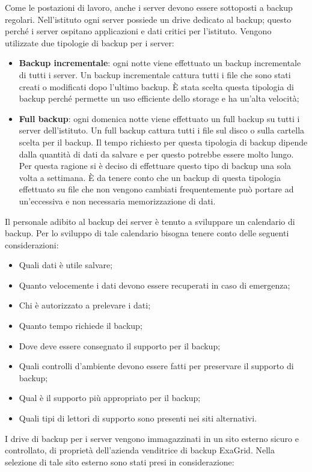 \documentclass[12pt, a4paper, titlepage]{report}
\newcommand{\backupVendor}{ExaGrid} %
\begin{document}
	Come le postazioni di lavoro, anche i server devono essere sottoposti a backup regolari. Nell'istituto ogni server possiede un drive dedicato al backup; questo perché i server ospitano applicazioni e dati critici per l'istituto. Vengono utilizzate due tipologie di backup per i server:
	\begin{itemize}
		\item \textbf{Backup incrementale}: ogni notte viene effettuato un backup incrementale di tutti i server. Un backup incrementale cattura tutti i file che sono stati creati o modificati dopo l'ultimo backup. È stata scelta questa tipologia di backup perché permette un uso efficiente dello storage e ha un'alta velocità;
		\item \textbf{Full backup}: ogni domenica notte viene effettuato un full backup su tutti i server dell'istituto. Un full backup cattura tutti i file sul disco o sulla cartella scelta per il backup. Il tempo richiesto per questa tipologia di backup dipende dalla quantità di dati da salvare e per questo potrebbe essere molto lungo. Per questa ragione si è deciso di effettuare questo tipo di backup una sola volta a settimana. È da tenere conto che un backup di questa tipologia effettuato su file che non vengono cambiati frequentemente può portare ad un'eccessiva e non necessaria memorizzazione di dati.
	\end{itemize}
	Il personale adibito al backup dei server è tenuto a sviluppare un calendario di backup. Per lo sviluppo di tale calendario bisogna tenere conto delle seguenti considerazioni:
	\begin{itemize}
		\item Quali dati è utile salvare;
		\item Quanto velocemente i dati devono essere recuperati in caso di emergenza;
		\item Chi è autorizzato a prelevare i dati;
		\item Quanto tempo richiede il backup;
		\item Dove deve essere consegnato il supporto per il backup;
		\item Quali controlli d'ambiente devono essere fatti per preservare il supporto di backup;
		\item Qual è il supporto più appropriato per il backup;
		\item Quali tipi di lettori di supporto sono presenti nei siti alternativi.
	\end{itemize}
	I drive di backup per i server vengono immagazzinati in un sito esterno sicuro e controllato, di proprietà dell'azienda venditrice di backup \backupVendor. Nella selezione di tale sito esterno sono stati presi in considerazione:
\end{document}
